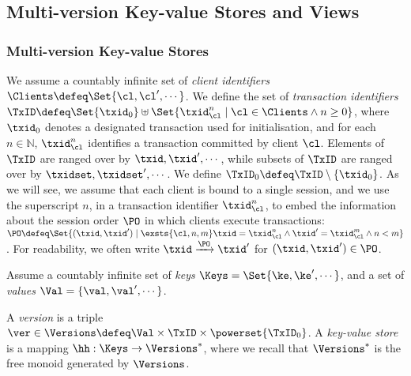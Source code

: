 \subsection{Multi-version Key-value Stores and Views}
\label{sec:mkvs-view}

\subsubsection{Multi-version Key-value Stores} 
We assume a countably infinite set of \emph{client identifiers} $\Clients \defeq \Set{\cl, \cl',\cdots}$. 
We define the set of \emph{transaction identifiers} 
$\TxID \defeq  \Set{\txid_{0}} \uplus \Set{ \txid_{\cl}^{n} \mid \cl \in \Clients \wedge n \geq 0 }$, where 
 $\txid_0$ denotes a designated transaction used for initialisation, 
 and for each $n \in \mathbb{N}$, $\txid_{\cl}^{n}$ identifies a transaction 
 committed by client $\cl$.
Elements of $\TxID$ are ranged over by $\txid, \txid', \cdots$, 
while subsets of $\TxID$ are ranged over by $\txidset, \txidset', \cdots$. 
We define $\TxID_{0} \defeq \TxID \setminus \{ \txid_0\}$.
As we will see, we assume that each client is bound to a single session, and 
we use the superscript $n$, in a transaction identifier $\txid_{\cl}^{n}$, 
to embed the information about the session order $\PO$ in which clients execute 
transactions:  
%
$\PO \defeq \Set{ (\txid, \txid') \mid \exsts{ \cl, n,m } \txid = \txid_{\cl}^{n} \wedge \txid' = \txid_{\cl}^{m} \wedge n < m}$.
For readability, we often write  $\txid \xrightarrow{\PO} \txid'$ for $(\txid, \txid') \in \PO$.



\begin{definition}
\label{def:his_heap}
\label{def:mkvs}
Assume a countably infinite set of \emph{keys} $\Keys = \Set{\ke, \ke', \cdots}$, 
and a set of \emph{values} $\Val = \{\val, \val', \cdots\}$.

A \emph{version} is a triple $\ver \in \Versions \defeq \Val \times \TxID \times \powerset{\TxID_{0}}$. 
A \emph{key-value store} is a mapping $\hh: \Keys \rightarrow \Versions^{\ast}$, 
where we recall that $\Versions^{\ast}$ is the free monoid generated by $\Versions$.
\end{definition}

